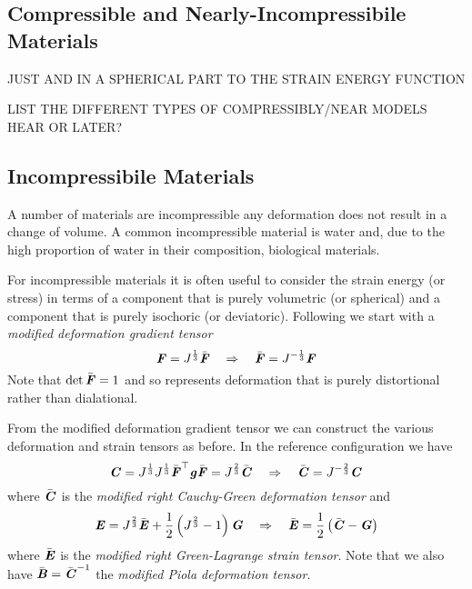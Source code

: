 \subsection{Compressible and Nearly-Incompressibile Materials}
\label{subsec:FiniteElasticityCompressibleNearlyIncompressibleMat}

JUST AND IN A SPHERICAL PART TO THE STRAIN ENERGY FUNCTION

LIST THE DIFFERENT TYPES OF COMPRESSIBLY/NEAR MODELS HEAR OR LATER?

\subsection{Incompressibile Materials}
\label{subsec:FiniteElasticityIncompressibleMat}

A number of materials are incompressible \ie any deformation does not
result in a change of volume. A common incompressible material is
water and, due to the high proportion of water in their composition,
biological materials.

For incompressible materials it is often useful to consider the strain
energy (or stress) in terms of a component that is purely volumetric
(or spherical) and a component that is purely isochoric (or
deviatoric). Following \citet{federico:2012} we start with a
\emph{modified deformation gradient
tensor} \ie
\begin{equation}
  \tensor{F}=J^{\frac{1}{3}}\bar{\tensor{F}} \quad\Rightarrow\quad \bar{\tensor{F}} =J^{-\frac{1}{3}}\tensor{F}
  \label{eqn:modifiedDeformationGradientTensor}
\end{equation}
Note that $\det \bar{\boldsymbol{\mathit{F}}}=1$ and so represents deformation that is
purely distortional rather than dialational. 

From the modified deformation gradient tensor we can construct the various
deformation and strain tensors as before. In the reference configuration we
have
\begin{equation}
  \boldsymbol{\mathit{C}} = J^{\frac{1}{3}}J^{\frac{1}{3}} {\bar{\boldsymbol{\mathit{F}}}}^{ \top } \boldsymbol{\mathit{g}}\bar{\boldsymbol{\mathit{F}}}=J^{\frac{2}{3}}\bar{\boldsymbol{\mathit{C}}} \quad\Rightarrow\quad \bar{\boldsymbol{\mathit{C}}} =J^{-\frac{2}{3}}\boldsymbol{\mathit{C}}
\end{equation}
where $\bar{\boldsymbol{\mathit{C}}}$ is the \emph{modified right Cauchy-Green deformation
  tensor} and
\begin{equation}
  \boldsymbol{\mathit{E}} =
  J^{\frac{2}{3}}{\bar{\boldsymbol{\mathit{E}}}}+\dfrac{1}{2}\left( J^{\frac{2}{3}}-1 \right)\boldsymbol{\mathit{G}}
  \quad\Rightarrow\quad \bar{\boldsymbol{\mathit{E}}} = \dfrac{1}{2}\left( \bar{\boldsymbol{\mathit{C}}}-\boldsymbol{\mathit{G}} \right)
\end{equation}
where $\bar{\boldsymbol{\mathit{E}}}$ is the \emph{modified right Green-Lagrange strain
  tensor}. Note that we also have
$\bar{\boldsymbol{\mathit{B}}}={\bar{\boldsymbol{\mathit{C}}}}^{-1}$ the \emph{modified Piola
  deformation tensor}.

